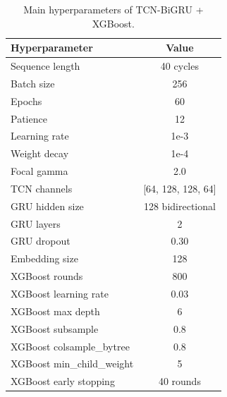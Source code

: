 \begin{table}[!t]
\centering
\caption{Main hyperparameters of TCN-BiGRU + XGBoost.}
\label{tab:hyperparameters}
\begin{tabular}{lc}
\hline
Hyperparameter & Value \\
\hline
Sequence length & 40 cycles \\
Batch size & 256 \\
Epochs & 60 \\
Patience & 12 \\
Learning rate & 1e-3 \\
Weight decay & 1e-4 \\
Focal gamma & 2.0 \\
TCN channels & [64, 128, 128, 64] \\
GRU hidden size & 128 bidirectional \\
GRU layers & 2 \\
GRU dropout & 0.30 \\
Embedding size & 128 \\
XGBoost rounds & 800 \\
XGBoost learning rate & 0.03 \\
XGBoost max depth & 6 \\
XGBoost subsample & 0.8 \\
XGBoost colsample\_bytree & 0.8 \\
XGBoost min\_child\_weight & 5 \\
XGBoost early stopping & 40 rounds \\
\hline
\end{tabular}
\end{table}

